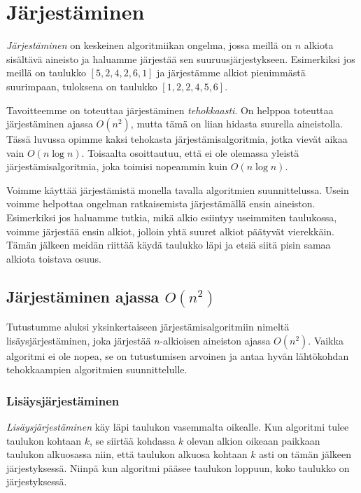 \chapter{Järjestäminen}

\emph{Järjestäminen} on keskeinen algoritmiikan ongelma,
jossa meillä on $n$ alkiota sisältävä aineisto
ja haluamme järjestää sen suuruusjärjestykseen.
Esimerkiksi jos meillä on taulukko $[5,2,4,2,6,1]$ ja
järjestämme alkiot pienimmästä suurimpaan,
tuloksena on taulukko $[1,2,2,4,5,6]$.

Tavoitteemme on toteuttaa järjestäminen
\emph{tehokkaasti}.
On helppoa toteuttaa järjestäminen ajassa $O(n^2)$,
mutta tämä on liian hidasta suurella aineistolla.
Tässä luvussa opimme kaksi tehokasta
järjestämisalgoritmia, jotka vievät aikaa vain $O(n \log n)$.
Toisaalta osoittautuu, että ei ole olemassa
yleistä järjestämisalgoritmia, joka toimisi nopeammin
kuin $O(n \log n)$.

Voimme käyttää järjestämistä monella tavalla
algoritmien suunnittelussa.
Usein voimme helpottaa ongelman ratkaisemista
järjestämällä ensin aineiston.
Esimerkiksi jos haluamme tutkia,
mikä alkio esiintyy useimmiten taulukossa,
voimme järjestää ensin alkiot,
jolloin yhtä suuret alkiot päätyvät vierekkäin.
Tämän jälkeen meidän riittää käydä taulukko läpi
ja etsiä siitä pisin samaa alkiota toistava osuus.

\section{Järjestäminen ajassa $O(n^2)$}

Tutustumme aluksi yksinkertaiseen järjestämisalgoritmiin
nimeltä lisäysjär\-jestäminen,
joka järjestää $n$-alkioisen aineiston ajassa $O(n^2)$.
Vaikka algoritmi ei ole nopea, se on tutustumisen arvoinen
ja antaa hyvän lähtökohdan tehokkaampien algoritmien
suunnittelulle.

\subsection{Lisäysjärjestäminen}

\emph{Lisäysjärjestäminen} käy läpi taulukon
vasemmalta oikealle.
Kun algoritmi tulee taulukon kohtaan $k$,
se siirtää kohdassa $k$ olevan alkion
oikeaan paikkaan taulukon
alkuosassa niin, että taulukon alkuosa
kohtaan $k$ asti on tämän jälkeen järjestyksessä.
Niinpä kun algoritmi pääsee taulukon loppuun,
koko taulukko on järjestyksessä.

